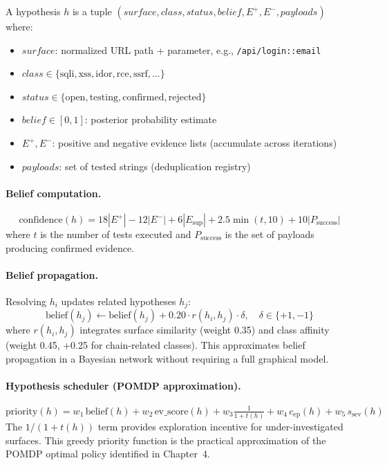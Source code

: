 \documentclass[12pt,a4paper,oneside,openany]{book}
\newcommand{\code}[1]{\texttt{#1}}
\begin{document}
\begin{definitionbox}[Hypothesis]
A hypothesis $h$ is a tuple $(surface, class, status, belief, E^+, E^-, payloads)$ where:
\begin{itemize}
\item $surface$: normalized URL path + parameter, e.g., \code{/api/login::email}
\item $class \in \{\text{sqli}, \text{xss}, \text{idor}, \text{rce}, \text{ssrf}, \ldots\}$
\item $status \in \{\text{open}, \text{testing}, \text{confirmed}, \text{rejected}\}$
\item $belief \in [0, 1]$: posterior probability estimate
\item $E^+, E^-$: positive and negative evidence lists (accumulate across iterations)
\item $payloads$: set of tested strings (deduplication registry)
\end{itemize}
\end{definitionbox}

\paragraph{Belief computation.}
\begin{equation}
\text{confidence}(h) = 18|E^+| - 12|E^-| + 6|E_{\text{sup}}| + 2.5\min(t,10) + 10|P_{\text{success}}|
\label{eq:confidence}
\end{equation}
where $t$ is the number of tests executed and $P_{\text{success}}$ is the set of payloads producing confirmed evidence.

\paragraph{Belief propagation.}
Resolving $h_i$ updates related hypotheses $h_j$:
\begin{equation}
\text{belief}(h_j) \leftarrow \text{belief}(h_j) + 0.20 \cdot r(h_i, h_j) \cdot \delta,\quad \delta \in \{+1,-1\}
\label{eq:propagation}
\end{equation}
where $r(h_i, h_j)$ integrates surface similarity (weight 0.35) and class affinity (weight 0.45, +0.25 for chain-related classes). This approximates belief propagation in a Bayesian network without requiring a full graphical model.

\paragraph{Hypothesis scheduler (POMDP approximation).}
\begin{equation}
\text{priority}(h) = w_1\,\text{belief}(h) + w_2\,\text{ev\_score}(h) + w_3\tfrac{1}{1+t(h)} + w_4\,c_{\text{ep}}(h) + w_5\,s_{\text{sev}}(h)
\label{eq:priority}
\end{equation}
The $1/(1+t(h))$ term provides exploration incentive for under-investigated surfaces. This greedy priority function is the practical approximation of the POMDP optimal policy identified in Chapter~4.
\end{document}
